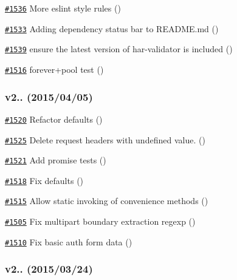 \begin{DoxyItemize}
\item \href{https://github.com/request/request/pull/1536}{\tt \#1536} More eslint style rules ()
\item \href{https://github.com/request/request/pull/1533}{\tt \#1533} Adding dependency status bar to R\+E\+A\+D\+M\+E.\+md ()
\item \href{https://github.com/request/request/pull/1539}{\tt \#1539} ensure the latest version of har-\/validator is included ()
\item \href{https://github.com/request/request/pull/1516}{\tt \#1516} forever+pool test ()
\end{DoxyItemize}

\subsubsection*{v2.. (2015/04/05)}


\begin{DoxyItemize}
\item \href{https://github.com/request/request/pull/1520}{\tt \#1520} Refactor defaults ()
\item \href{https://github.com/request/request/pull/1525}{\tt \#1525} Delete request headers with undefined value. ()
\item \href{https://github.com/request/request/pull/1521}{\tt \#1521} Add promise tests ()
\item \href{https://github.com/request/request/pull/1518}{\tt \#1518} Fix defaults ()
\item \href{https://github.com/request/request/pull/1515}{\tt \#1515} Allow static invoking of convenience methods ()
\item \href{https://github.com/request/request/pull/1505}{\tt \#1505} Fix multipart boundary extraction regexp ()
\item \href{https://github.com/request/request/pull/1510}{\tt \#1510} Fix basic auth form data ()
\end{DoxyItemize}

\subsubsection*{v2.. (2015/03/24)}


